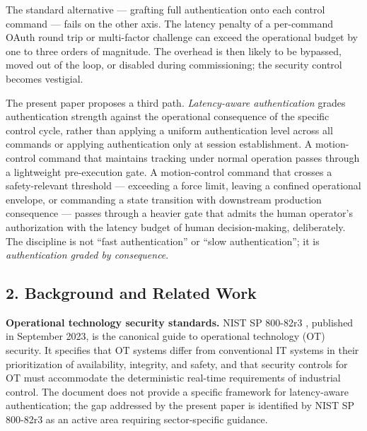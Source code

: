 The standard alternative --- grafting full authentication onto each
control command --- fails on the other axis. The latency penalty of a
per-command OAuth round trip or multi-factor challenge can exceed the
operational budget by one to three orders of magnitude. The overhead is
then likely to be bypassed, moved out of the loop, or disabled during
commissioning; the security control becomes vestigial.

The present paper proposes a third path. \emph{Latency-aware
authentication} grades authentication strength against the operational
consequence of the specific control cycle, rather than applying a
uniform authentication level across all commands or applying
authentication only at session establishment. A motion-control command
that maintains tracking under normal operation passes through a
lightweight pre-execution gate. A motion-control command that crosses a
safety-relevant threshold --- exceeding a force limit, leaving a
confined operational envelope, or commanding a state transition with
downstream production consequence --- passes through a heavier gate that
admits the human operator's authorization with the latency budget of
human decision-making, deliberately. The discipline is not ``fast
authentication'' or ``slow authentication''; it is \emph{authentication
graded by consequence}.

\subsection{2. Background and Related
Work}\label{background-and-related-work}

\textbf{Operational technology security standards.} NIST SP 800-82r3
\cite{ref2}, published in September 2023, is the canonical guide to
operational technology (OT) security. It specifies that OT systems
differ from conventional IT systems in their prioritization of
availability, integrity, and safety, and that security controls for OT
must accommodate the deterministic real-time requirements of industrial
control. The document does not provide a specific framework for
latency-aware authentication; the gap addressed by the present paper is
identified by NIST SP 800-82r3 as an active area requiring
sector-specific guidance.

